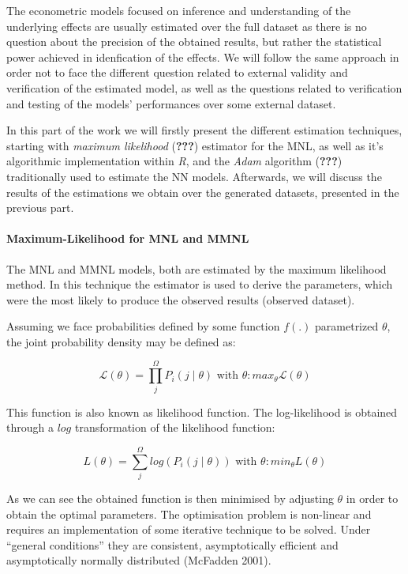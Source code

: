\documentclass[11pt,]{article}
\let\oldparagraph\paragraph
\renewcommand{\paragraph}[1]{\oldparagraph{#1}\mbox{}}
\begin{document}
The econometric models focused on inference and understanding of the
underlying effects are usually estimated over the full dataset as there
is no question about the precision of the obtained results, but rather
the statistical power achieved in idenfication of the effects. We will
follow the same approach in order not to face the different question
related to external validity and verification of the estimated model, as
well as the questions related to verification and testing of the models'
performances over some external dataset.

In this part of the work we will firstly present the different
estimation techniques, starting with \emph{maximum likelihood}
({\textbf{???}}) estimator for the MNL, as well as it's algorithmic
implementation within \emph{R}, and the \emph{Adam} algorithm
({\textbf{???}}) traditionally used to estimate the NN models.
Afterwards, we will discuss the results of the estimations we obtain
over the generated datasets, presented in the previous part.

\hypertarget{maximum-likelihood-for-mnl-and-mmnl}{%
\paragraph{Maximum-Likelihood for MNL and
MMNL}\label{maximum-likelihood-for-mnl-and-mmnl}}

The MNL and MMNL models, both are estimated by the maximum likelihood
method. In this technique the estimator is used to derive the
parameters, which were the most likely to produce the observed results
(observed dataset).

Assuming we face probabilities defined by some function \(f(.)\)
parametrized \(\theta\), the joint probability density may be defined
as:

\begin{equation}
\mathcal{L}(\theta) = \prod_{j}^{\Omega} P_{i}(j \mid \theta) \text{  with  } \theta: max_{\theta} \mathcal{L}(\theta)
\end{equation}

This function is also known as likelihood function. The log-likelihood
is obtained through a \(log\) transformation of the likelihood function:

\begin{equation}
L(\theta) = \sum_{j}^{\Omega} log(P_{i}(j \mid \theta)) \text{  with  } \theta: min_{\theta} L(\theta)
\end{equation}

As we can see the obtained function is then minimised by adjusting
\(\theta\) in order to obtain the optimal parameters. The optimisation
problem is non-linear and requires an implementation of some iterative
technique to be solved. Under ``general conditions'' they are
consistent, asymptotically efficient and asymptotically normally
distributed (McFadden 2001).
\end{document}
